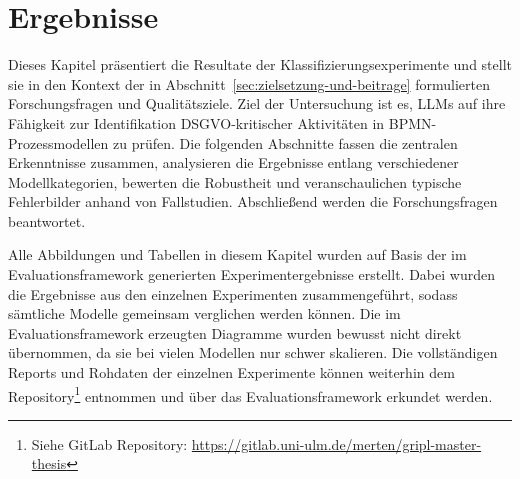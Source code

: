 \chapter{Ergebnisse}\label{ch:ergebnisse}

Dieses Kapitel präsentiert die Resultate der Klassifizierungsexperimente und stellt sie in den Kontext der in Abschnitt~\ref{sec:zielsetzung-und-beitrage} formulierten Forschungsfragen und Qualitätsziele. Ziel der Untersuchung ist es, \acp{LLM} auf ihre Fähigkeit zur Identifikation \ac{DSGVO}-kritischer Aktivitäten in \ac{BPMN}-Prozessmodellen zu prüfen. Die folgenden Abschnitte fassen die zentralen Erkenntnisse zusammen, analysieren die Ergebnisse entlang verschiedener Modellkategorien, bewerten die Robustheit und veranschaulichen typische Fehlerbilder anhand von Fallstudien. Abschließend werden die Forschungsfragen beantwortet.

Alle Abbildungen und Tabellen in diesem Kapitel wurden auf Basis der im Evaluationsframework generierten Experimentergebnisse erstellt. Dabei wurden die Ergebnisse aus den einzelnen Experimenten zusammengeführt, sodass sämtliche Modelle gemeinsam verglichen werden können. Die im Evaluationsframework erzeugten Diagramme wurden bewusst nicht direkt übernommen, da sie bei vielen Modellen nur schwer skalieren. Die vollständigen Reports und Rohdaten der einzelnen Experimente können weiterhin dem Repository\footnote{Siehe GitLab Repository: \url{https://gitlab.uni-ulm.de/merten/gripl-master-thesis}} entnommen und über das Evaluationsframework erkundet werden.






